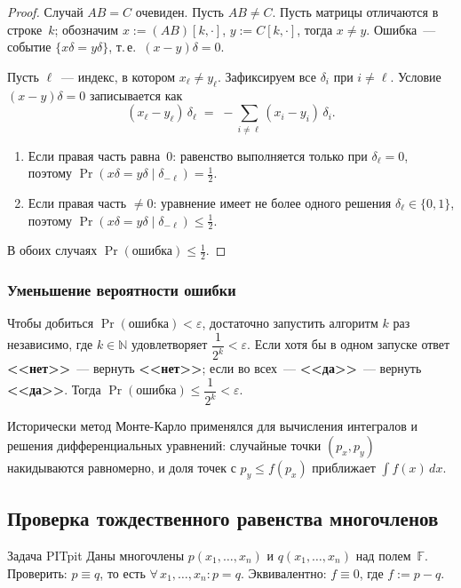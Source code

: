 \begin{proof}
	Случай $AB = C$ очевиден. Пусть $AB \neq C$.
	Пусть матрицы отличаются в строке~$k$; обозначим $x := (AB)[k,\cdot]$,
	$y := C[k,\cdot]$, тогда $x \neq y$.
	Ошибка~--- событие $\{x\delta = y\delta\}$, т.\,е.\ $(x-y)\delta = 0$.
	
	Пусть $\ell$~--- индекс, в котором $x_\ell \neq y_\ell$.
	Зафиксируем все $\delta_i$ при $i \neq \ell$.
	Условие $(x-y)\delta = 0$ записывается как
	\[
	(x_\ell - y_\ell)\,\delta_\ell \;=\; -\!\sum_{i \neq \ell}(x_i - y_i)\,\delta_i.
	\]
	\begin{enumerate}
		\item Если правая часть равна~$0$: равенство выполняется только при $\delta_\ell = 0$,
		поэтому $\Pr(x\delta = y\delta \mid \delta_{-\ell}) = \tfrac{1}{2}$.
		\item Если правая часть $\neq 0$: уравнение имеет не более одного решения
		$\delta_\ell \in \{0,1\}$, поэтому $\Pr(x\delta = y\delta \mid \delta_{-\ell}) \leq \tfrac{1}{2}$.
	\end{enumerate}
	В обоих случаях $\Pr(\text{ошибка}) \leq \tfrac{1}{2}$.
\end{proof}

\subsubsection*{Уменьшение вероятности ошибки}

Чтобы добиться $\Pr(\text{ошибка}) < \varepsilon$, достаточно запустить алгоритм
$k$ раз независимо, где $k \in \mathbb{N}$ удовлетворяет $\dfrac{1}{2^k} < \varepsilon$.
Если хотя бы в одном запуске ответ \textbf{<<нет>>}~--- вернуть \textbf{<<нет>>};
если во всех~--- \textbf{<<да>>}~--- вернуть \textbf{<<да>>}.
Тогда $\Pr(\text{ошибка}) \leq \dfrac{1}{2^k} < \varepsilon$.

\begin{Remark}{}{}
	Исторически метод Монте-Карло применялся для вычисления интегралов и решения
	дифференциальных уравнений: случайные точки $(p_x, p_y)$ накидываются равномерно,
	и доля точек с $p_y \leq f(p_x)$ приближает $\int f(x)\,dx$.
\end{Remark}

\subsection{Проверка тождественного равенства многочленов}

\begin{Definition}{Задача PIT}{pit}
	Даны многочлены $p(x_1,\ldots,x_n)$ и $q(x_1,\ldots,x_n)$ над полем~$\mathbb{F}$.
	Проверить: $p \equiv q$, то есть $\forall\,x_1,\ldots,x_n\colon p = q$.
	Эквивалентно: $f \equiv 0$, где $f := p - q$.
\end{Definition}

